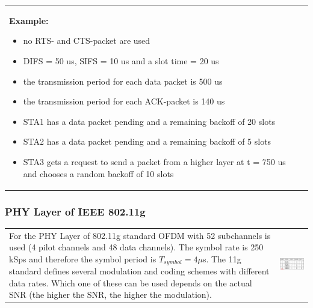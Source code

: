 \begin{tabular}{ll}
	\parbox{7cm}{
		\textbf{Example:} \\
		\begin{itemize}	
			\item  no RTS- and CTS-packet are used
			\item  DIFS = 50 us, SIFS = 10 us and a slot time = 20 us
			\item  the transmission period for each data packet is 500 us
			\item  the transmission period for each ACK-packet is 140 us
			\item  STA1 has a data packet pending and a remaining backoff of 20 slots
			\item  STA2 has a data packet pending and a remaining backoff of 5 slots
			\item  STA3 gets a request to send a packet from a higher layer at t = 750 us
			and chooses a random backoff of 10 slots
		\end{itemize}
	}
	& \parbox{11cm}{
		 \\ 
	}
\end{tabular}	
	
\subsubsection{PHY Layer of IEEE 802.11g}
	\begin{tabular}{ll}
		\parbox{11cm}{
			For the PHY Layer of 802.11g standard OFDM with 52 subchannels is used (4 pilot channels and 48 data channels). 
			The symbol rate is 250 kSps and therefore the symbol period is $T_{symbol}=4\mu$s. The 11g standard defines several modulation
			and coding schemes with different data rates. Which one of these can be used depends on the actual SNR
			(the higher the SNR, the higher the modulation). 				
		}
		& \parbox{7cm}{
			\includegraphics[width=7cm]{./bilder/wlan-phy.png} \\ 
		}
	\end{tabular}
	
